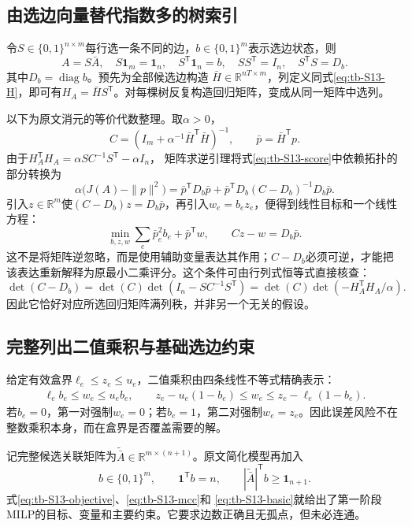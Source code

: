 \documentclass[UTF8,11pt,fontset=fandol,openany,oneside]{ctexbook}
\theoremstyle{definition}
\theoremstyle{remark}
\numberwithin{equation}{chapter}
\begin{document}
\subsection{由选边向量替代指数多的树索引}

令$S\in\{0,1\}^{n\times m}$每行选一条不同的边，$b\in\{0,1\}^m$表示选边状态，则
\[
 A=S\bar A,\quad S\mathbf1_m=\mathbf1_n,\quad
 S^{\mathsf T}\mathbf1_n=b,\quad
 SS^{\mathsf T}=I_n,\quad S^{\mathsf T}S=D_b.
\]
其中$D_b=\operatorname{diag}b$。预先为全部候选边构造
$\bar H\in\mathbb R^{nT\times m}$，列定义同式\eqref{eq:tb-S13-H}，即可有$H_A=\bar H S^{\mathsf T}$。对每棵树反复构造回归矩阵，变成从同一矩阵中选列。

以下为原文消元的等价代数整理。取$\alpha>0$，
\begin{equation}
 C=(I_m+\alpha^{-1}\bar H^{\mathsf T}\bar H)^{-1},
 \qquad \bar p=\bar H^{\mathsf T}p.
 \label{eq:tb-S13-C}
\end{equation}
由于$H_A^{\mathsf T}H_A=\alpha SC^{-1}S^{\mathsf T}-\alpha I_n$，
矩阵求逆引理将式\eqref{eq:tb-S13-score}中依赖拓扑的部分转换为
\[
 \alpha\bigl(J(A)-\|p\|^2\bigr)
 =\bar p^{\mathsf T}D_b\bar p+
   \bar p^{\mathsf T}D_b(C-D_b)^{-1}D_b\bar p.
\]
引入$z\in\mathbb R^m$使$(C-D_b)z=D_b\bar p$，再引入$w_e=b_ez_e$，便得到线性目标和一个线性方程：
\begin{equation}
 \min_{b,z,w}\sum_e\bar p_e^2b_e+\bar p^{\mathsf T}w,
 \qquad Cz-w=D_b\bar p.
 \label{eq:tb-S13-objective}
\end{equation}
这不是将矩阵逆忽略，而是使用辅助变量表达其作用；$C-D_b$必须可逆，才能把该表达重新解释为原最小二乘评分。这个条件可由行列式恒等式直接核查：
\[
 \det(C-D_b)=\det(C)\det(I_n-SC^{-1}S^{\mathsf T})
 =\det(C)\det(-H_A^{\mathsf T}H_A/\alpha).
\]
因此它恰好对应所选回归矩阵满列秩，并非另一个无关的假设。

\subsection{完整列出二值乘积与基础选边约束}

给定有效盒界$\ell_e\leq z_e\leq u_e$，二值乘积由四条线性不等式精确表示：
\begin{align}
 \ell_eb_e\leq w_e\leq u_eb_e,\qquad
 z_e-u_e(1-b_e)\leq w_e\leq z_e-\ell_e(1-b_e).
 \label{eq:tb-S13-mcc}
\end{align}
若$b_e=0$，第一对强制$w_e=0$；若$b_e=1$，第二对强制$w_e=z_e$。因此误差风险不在整数乘积本身，而在盒界是否覆盖需要的解。

记完整候选关联矩阵为$\widetilde{\bar A}\in\mathbb R^{m\times(n+1)}$。原文简化模型再加入
\begin{equation}
 b\in\{0,1\}^m,\qquad \mathbf1^{\mathsf T}b=n,\qquad
 |\widetilde{\bar A}|^{\mathsf T}b\geq\mathbf1_{n+1}.
 \label{eq:tb-S13-basic}
\end{equation}
式\eqref{eq:tb-S13-objective}、\eqref{eq:tb-S13-mcc}和
\eqref{eq:tb-S13-basic}就给出了第一阶段MILP的目标、变量和主要约束。它要求边数正确且无孤点，但未必连通。
\end{document}
